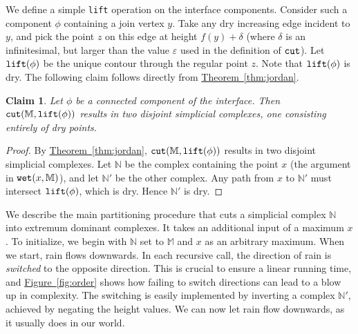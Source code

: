 \documentclass[11pt]{article}
\newtheorem{claim}[theorem]{Claim}
\theoremstyle{definition}
\newcommand{\MM}{\mathbb{M}}
\newcommand{\NN}{\mathbb{N}}
\newcommand{\eps}{\varepsilon}
\newcommand{\Sec}[1]{\hyperref[sec:#1]{\S\ref*{sec:#1}}} %
\newcommand{\Fig}[1]{\hyperref[fig:#1]{Figure~\ref*{fig:#1}}} %
\newcommand{\Thm}[1]{\hyperref[thm:#1]{Theorem~\ref*{thm:#1}}} %
\newcommand{\cut}{{\tt cut}}
\newcommand{\lift}{{\tt lift}}
\newcommand{\rain}{{\tt rain}}
\newcommand{\wet}{{\tt wet}}
\begin{document}
We define a simple \lift{} operation on the interface components. Consider such a component $\phi$ containing
a join vertex $y$. Take any dry increasing edge incident to $y$, and pick the point $z$ on this edge at height
$f(y) + \delta$ (where $\delta$ is an infinitesimal, but larger than the value $\eps$ used in the definition of $\cut$). 
Let $\lift(\phi)$ be the unique contour through the regular point $z$. Note that $\lift(\phi)$ is dry.
The following claim follows directly from \Thm{jordan}.

\begin{claim} \label{clm:cut-int} Let $\phi$ be a connected component of the interface. Then $\cut(\MM,\lift(\phi))$
results in two disjoint simplicial complexes, one consisting entirely of dry points.
\end{claim}

\begin{proof} By \Thm{jordan}, $\cut(\MM,\lift(\phi))$ results in two disjoint simplicial complexes. Let $\NN$ be the complex containing
the point $x$ (the argument in $\wet(x,\MM)$), and let $\NN'$ be the other complex. 
Any path from $x$ to $\NN'$ must intersect $\lift(\phi)$, which is dry. Hence $\NN'$ is dry.
%
%
\end{proof}

We describe the main partitioning procedure that cuts a simplicial complex $\NN$ into extremum
dominant complexes. It takes an additional input of a maximum $x$. To initialize,
we begin with $\NN$ set to $\MM$ and $x$ as an arbitrary maximum. 
When we start, rain flows downwards. In each recursive call, the direction of rain is \emph{switched} to the 
opposite direction. This is crucial to ensure a linear running time, and \Fig{order} shows how failing to switch 
directions can lead to a blow up in complexity. 
The switching is easily implemented by inverting a complex $\NN'$, achieved by negating the height values.
We can now let rain flow downwards, as it usually does in our world.
\end{document}
